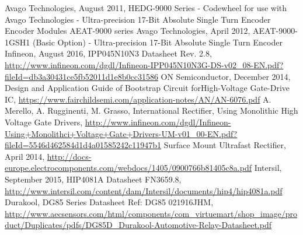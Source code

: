 \begin{thebibliography}{21} %
	Avago Technologies, August 2011, HEDG-9000 Series - Codewheel for use with Avago Technologies - Ultra-precision 17-Bit Absolute Single Turn Encoder
Encoder Modules AEAT-9000 series
	Avago Technologies, April 2012, AEAT-9000-1GSH1 (Basic Option) - Ultra-precision 17-Bit Absolute Single Turn Encoder
	Infineon, August 2016, IPP045N10N3 Datasheet Rev. 2.8, \url{http://www.infineon.com/dgdl/Infineon-IPP045N10N3G-DS-v02_08-EN.pdf?fileId=db3a30431ce5fb52011d1e8b0cc31586}
	ON Semiconductor, December 2014, Design and Application Guide of Bootstrap Circuit forHigh-Voltage Gate-Drive IC, \url{https://www.fairchildsemi.com/application-notes/AN/AN-6076.pdf}
	A. Merello, A. Rugginenti, M. Grasso, International Rectifier, Using Monolithic High Voltage Gate Drivers, \url{http://www.infineon.com/dgdl/Infineon-Using+Monolithci+Voltage+Gate+Drivers-UM-v01_00-EN.pdf?fileId=5546d462584d1d4a01585242c11947b1}
	Surface Mount Ultrafast Rectifier, April 2014, \url{http://docs-europe.electrocomponents.com/webdocs/1405/0900766b81405c8a.pdf}
	Intersil, September 2015, HIP4081A Datasheet FN3659.8, \url{http://www.intersil.com/content/dam/Intersil/documents/hip4/hip4081a.pdf}
	Durakool, DG85 Series Datasheet Ref: DG85 021916JHM, \url{http://www.aecsensors.com/html/components/com_virtuemart/shop_image/product/Duplicates/pdfs/DG85D_Durakool-Automotive-Relay-Datasheet.pdf}
\end{thebibliography}